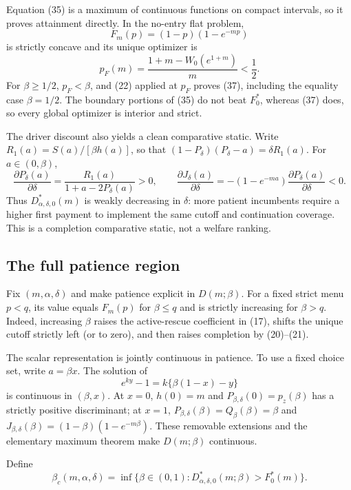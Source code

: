 \documentclass[mnsc,dblanonrev]{informs4}
\begin{document}
Equation (35) is a maximum of continuous functions on compact intervals, so
it proves attainment directly.  In the no-entry flat problem,
\[
 F_m(p)=(1-p)(1-e^{-mp})
\]
is strictly concave and its unique optimizer is
\[
 p_F(m)=\frac{1+m-W_0(e^{1+m})}{m}<\frac12.                 \tag{38}
\]
For $\beta\ge1/2$, $p_F<\beta$, and (22) applied at $p_F$ proves (37),
including the equality case $\beta=1/2$.  The boundary portions of (35) do
not beat $F_0^*$, whereas (37) does, so every global optimizer is interior and
strict.

The driver discount also yields a clean comparative static.  Write
$R_1(a)=S(a)/[\beta h(a)]$, so that
$(1-P_\delta)(P_\delta-a)=\delta R_1(a)$.  For
$a\in(0,\beta)$,
\[
 \frac{\partial P_\delta(a)}{\partial\delta}
 =\frac{R_1(a)}{1+a-2P_\delta(a)}>0,
 \qquad
 \frac{\partial J_\delta(a)}{\partial\delta}
 =-(1-e^{-ma})
 \frac{\partial P_\delta(a)}{\partial\delta}<0.            \tag{38a}
\]
Thus $D_{\alpha,\delta,0}^*(m)$ is weakly decreasing in $\delta$: more
patient incumbents require a higher first payment to implement the same
cutoff and continuation coverage.  This is a completion comparative static,
not a welfare ranking.

\subsection{The full patience region}

Fix $(m,\alpha,\delta)$ and make patience explicit in $D(m;\beta)$.  For a fixed
strict menu $p<q$, its value equals $F_m(p)$ for $\beta\le q$ and is strictly
increasing for $\beta>q$.  Indeed, increasing $\beta$ raises the active-rescue
coefficient in (17), shifts the unique cutoff strictly left (or to zero), and
then raises completion by (20)--(21).

The scalar representation is jointly continuous in patience.  To use a fixed
choice set, write $a=\beta x$.  The solution of
\[
 e^{ky}-1=k\{\beta(1-x)-y\}
\]
is continuous in $(\beta,x)$.  At $x=0$, $h(0)=m$ and
$P_{\beta,\delta}(0)=p_z(\beta)$ has a strictly positive discriminant; at
$x=1$, $P_{\beta,\delta}(\beta)=Q_\beta(\beta)=\beta$ and
$J_{\beta,\delta}(\beta)=(1-\beta)(1-e^{-m\beta})$.  These removable extensions and
the elementary maximum theorem make $D(m;\beta)$ continuous.

Define
\[
 \beta_c(m,\alpha,\delta)=
 \inf\{\beta\in(0,1):D_{\alpha,\delta,0}^*(m;\beta)>F_0^*(m)\}. \tag{39}
\]
\end{document}
